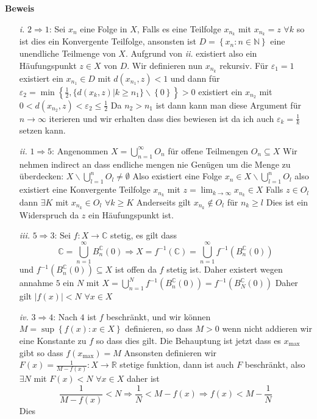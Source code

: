 \documentclass{article}
\begin{document}
\textbf{Beweis}\begin{itemize}
  \item[\textit{i.}]{$2 \Rightarrow 1$: Sei $x_n$ eine Folge in $X$, Falls es eine Teilfolge $x_{n_k}$ mit $x_{n_k}=z$ $\forall k$ so ist dies ein Konvergente Teilfolge, ansonsten ist
    $D=\left\lbrace x_n:n\in \mathbb{N}\right\rbrace$ eine unendliche Teilmenge von $X$. Aufgrund von \textit{ii.} existiert also ein Häufungspunkt $z\in X$ von $D$. Wir definieren nun $x_{n_k}$ rekursiv. Für $\varepsilon_1=1$ existiert ein $x_{n_1} \in D$ mit $d(x_{n_1},z)< 1$ und dann für $\varepsilon_2=\min \left\lbrace \frac{1}{2}, \lbrace d(x_{k}, z)|k\ge n_1\rbrace\backslash \left\lbrace0\right\rbrace\right\rbrace >0$ existiert ein $x_{n_2}$ mit $0<d(x_{n_2}, z)< \varepsilon_2 \le \frac{1}{2}$ Da $n_2>n_1$ ist dann kann man diese Argument für $ n \rightarrow \infty$ iterieren und wir erhalten dass dies bewiesen ist da ich auch $\varepsilon_k=\frac{1}{k}$ setzen kann.}
  \item[\textit{ii.}]{$1 \Rightarrow 5$: Angenommen $X= \bigcup_{n=1}^\infty O_n$ für offene Teilmengen $O_n\subseteq X$ Wir nehmen indirect an dass endliche mengen nie Genügen um die Menge zu überdecken:
    $X\backslash \bigcup_{l=1}^nO_l\neq \emptyset$ Also existiert eine Folge $x_n\in X\backslash \bigcup_{l=1}^n O_l$ also existiert eine Konvergente Teilfolge $x_{n_k}$ mit $z=\lim_{k\rightarrow\infty}x_{n_k}\in X$  
    Falls $z\in O_l$ dann $\exists K$ mit $x_{n_k}\in O_l$ $\forall k\ge K$ Anderseits gilt $x_{n_k}\not\in O_l$ für $n_k\ge l$ Dies ist ein Widerspruch da $z$ ein Häufungspunkt ist.}
  \item[\textit{iii.}]{$5 \Rightarrow 3$: Sei $f:X \rightarrow \mathbb{C }$ stetig, es gilt dass \[\mathbb{C}=\bigcup_{n=1}^\infty B_n^\mathbb{C }(0) \Longrightarrow X= f^{-1}(\mathbb{C})=\bigcup_{n=1}^\infty f^{-1}(B_n^\mathbb{C }(0))\]
    und $f^{-1}(B_n^\mathbb{C }(0))\subseteq X$ ist offen da $f$ stetig ist. Daher existert wegen annahme $5$ ein $N$ mit $X=\bigcup_{n=1}^N f^{-1}(B_n^\mathbb{C }(0))=f^{-1}(B_N^\mathbb{C }(0))$ Daher gilt 
    $|f(x)|< N$  $\forall x\in X$}
  \item[\textit{iv.}]{$3 \Rightarrow 4$: Nach $4$ ist $f$ beschränkt, und wir können $M=\sup \left\lbrace f(x):x\in X\right\rbrace$ definieren, so dass $M>0$ wenn nicht addieren wir eine Konstante zu $f$ so dass dies gilt. Die Behauptung ist jetzt
    dass es $x_{\text{max}}$ gibt so dass $f(x_{\text{max}})=M$ Ansonsten definieren wir $F(x)=\frac{1}{M-f(x)}:X \rightarrow \mathbb{R}$ stetige funktion, dann ist auch $F$ beschränkt, also $\exists N$ mit $F(x)<N$ $\forall x\in X$ daher ist \[\frac{1}{M-f(x)}<N \Rightarrow \frac{1}{N}<M-f(x) \Rightarrow f(x)<M-\frac{1}{N}\]Dies 
}
\end{itemize}
\end{document}
